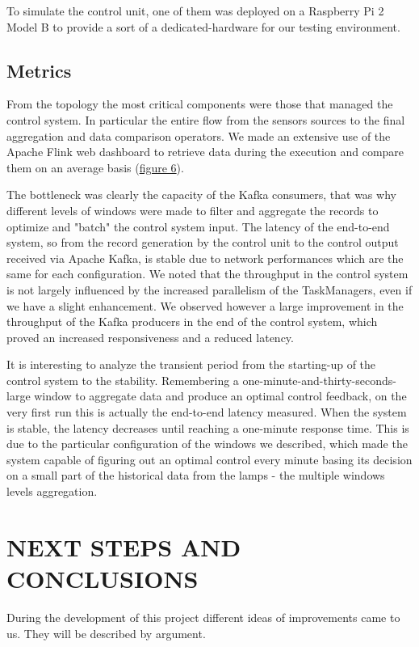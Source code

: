 To simulate the control unit, one of them was deployed on a Raspberry Pi 2 Model B to provide a sort of a dedicated-hardware for our testing environment.

\subsection{Metrics}
From the topology the most critical components were those that managed the control system. In particular the entire flow from the sensors sources to the final aggregation and data comparison operators. We made an extensive use of the Apache Flink web dashboard to retrieve data during the execution and compare them on an average basis (\hyperref[fig:ember_metrics]{figure 6}).

The bottleneck was clearly the capacity of the Kafka consumers, that was why different levels of windows were made to filter and aggregate the records to optimize and "batch" the control system input. The latency of the end-to-end system, so from the record generation by the control unit to the control output received via Apache Kafka, is stable due to network performances which are the same for each configuration. We noted that the throughput in the control system is not largely influenced by the increased parallelism of the TaskManagers, even if we have a slight enhancement. We observed however a large improvement in the throughput of the Kafka producers in the end of the control system, which proved an increased responsiveness and a reduced latency. 

It is interesting to analyze the transient period from the starting-up of the control system to the stability. Remembering a one-minute-and-thirty-seconds-large window to aggregate data and produce an optimal control feedback, on the very first run this is actually the end-to-end latency measured. When the system is stable, the latency decreases until reaching a one-minute response time. This is due to the particular configuration of the windows we described, which made the system capable of figuring out an optimal control every minute basing its decision on a small part of the historical data from the lamps - the multiple windows levels aggregation.

\section{NEXT STEPS AND CONCLUSIONS}
During the development of this project different ideas of improvements came to us. They will be described by argument.

